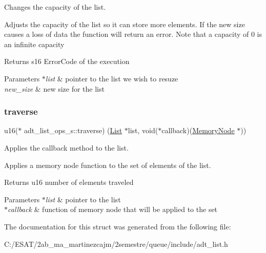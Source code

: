 Changes the capacity of the list. 

Adjusts the capacity of the list so it can store more elements. If the new size causes a loss of data the function will return an error. Note that a capacity of 0 is an infinite capacity

\begin{DoxyReturn}{Returns}
s16 Error\+Code of the execution 
\end{DoxyReturn}

\begin{DoxyParams}{Parameters}
{\em $\ast$list} & pointer to the list we wish to resuze \\
\hline
{\em new\+\_\+size} & new size for the list \\
\hline
\end{DoxyParams}
\mbox{\label{structadt__list__ops__s_a0b028b97d034c3d49b50f5a56dc271a5}} 
\subsubsection{\texorpdfstring{traverse}{traverse}}
{\footnotesize\ttfamily u16($\ast$ adt\+\_\+list\+\_\+ops\+\_\+s\+::traverse) (\hyperlink{structadt__list__s}{List} $\ast$list, void($\ast$callback)(\hyperlink{structmemory__node__s}{Memory\+Node} $\ast$))}



Applies the callback method to the list. 

Applies a memory node function to the set of elements of the list.

\begin{DoxyReturn}{Returns}
u16 number of elements traveled 
\end{DoxyReturn}

\begin{DoxyParams}{Parameters}
{\em $\ast$list} & pointer to the list \\
\hline
{\em $\ast$callback} & function of memory node that will be applied to the set \\
\hline
\end{DoxyParams}


The documentation for this struct was generated from the following file\+:\begin{DoxyCompactItemize}
\item 
C\+:/\+E\+S\+A\+T/2ab\+\_\+ma\+\_\+martinezcajm/2semestre/queue/include/adt\+\_\+list.\+h\end{DoxyCompactItemize}
